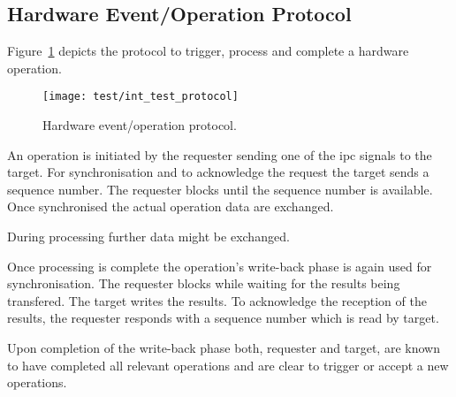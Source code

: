 	\subsection{Hardware Event/Operation Protocol}
		Figure~\ref{fig:int_test_protocol} depicts the protocol to trigger, process and complete a hardware operation.

		\begin{figure}[h]
			\centering	
			\texttt{[image: test/int\_test\_protocol]}
			\caption{Hardware event/operation protocol.}
			\label{fig:int_test_protocol}
		\end{figure}

		An operation is initiated by the requester sending one of the \gls{ipc} signals to the target. For synchronisation and to acknowledge the request the target sends a sequence number. The requester blocks until the sequence number is available. Once synchronised the actual operation data are exchanged.

		During processing further data might be exchanged.

		Once processing is complete the operation's write-back phase is again used for synchronisation. The requester blocks while waiting for the results being transfered. The target writes the results. To acknowledge the reception of the results, the requester responds with a sequence number which is read by target.

		Upon completion of the write-back phase both, requester and target, are known to have completed all relevant operations and are clear to trigger or accept a new operations.
